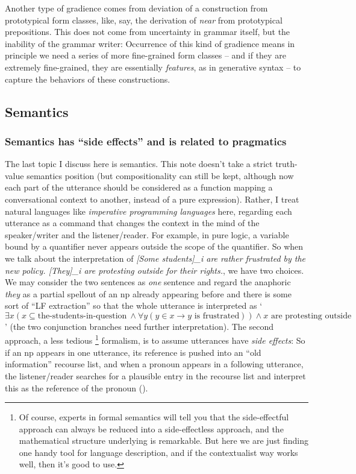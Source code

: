 \documentclass[UTF8, a4paper, oneside, scheme=plain]{ctexrep}
\newcommand{\corpus}[1]{\emph{#1}}
\newcommand{\translate}[1]{`#1'}
\begin{document}
Another type of gradience comes from deviation of a construction
from prototypical form classes,
like, say, the derivation of \corpus{near} from prototypical prepositions.
This does not come from uncertainty in grammar itself, 
but the inability of the grammar writer:
Occurrence of this kind of gradience means 
in principle we need a series of more fine-grained form classes 
-- and if they are extremely fine-grained, they are essentially \emph{features},
as in generative syntax --
to capture the behaviors of these constructions.

\subsection{Semantics}\label{sec:semantics}

\subsubsection{Semantics has ``side effects'' and is related to pragmatics}\label{sec:semantics.side-effect}

The last topic I discuss here is semantics.
This note doesn't take a strict truth-value semantics position
(but compositionality can still be kept,
although now each part of the utterance should be considered as a function 
mapping a conversational context to another,
instead of a pure expression).
Rather, I treat natural languages like \emph{imperative programming languages} here,
regarding each utterance as a command that changes 
the context in the mind of the speaker/writer and the listener/reader.
For example, in pure logic, 
a variable bound by a quantifier never appears outside the scope of the quantifier.
So when we talk about the interpretation of 
\corpus{[Some students]_{i} are rather frustrated by the new policy. 
[They]_i are protesting outside for their rights.},
we have two choices.
We may consider the two sentences as \emph{one} sentence
and regard the anaphoric \corpus{they} as a partial spellout 
of an \acs{np} already appearing before
and there is some sort of ``LF extraction'' so that the whole utterance is interpreted as 
\translate{$\exists x (x \subseteq \text{the-students-in-question} \  
\land \forall y (y \in x \rightarrow \text{$y$ is frustrated}) )
\land \text{$x$ are protesting outside} $} 
(the two conjunction branches need further interpretation).
The second approach, a less tedious%
\footnote{
    Of course, experts in formal semantics 
    will tell you that the side-effectful approach 
    can always be reduced into a side-effectless approach,
    and the mathematical structure underlying is remarkable.
    But here we are just finding one handy tool for language description,
    and if the contextualist way works well, 
    then it's good to use.
}
formalism, is to assume utterances have \emph{side effects}:
So if an \acs{np} appears in one utterance, 
its reference is pushed into an ``old information'' recourse list,
and when a pronoun appears in a following utterance, 
the listener/reader searches for a plausible entry in the recourse list 
and interpret this as the reference of the pronoun ().
\end{document}
